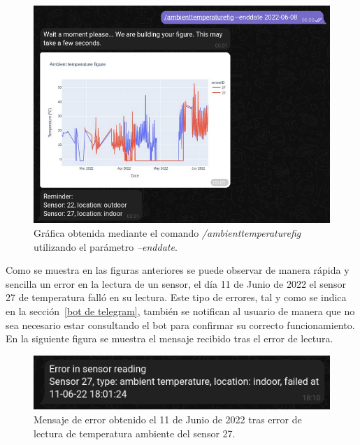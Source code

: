 \documentclass[a4paper, 12pt, oneside]{book}
\begin{document}
\begin{figure}[H]
	\centering
    \includegraphics[width=12cm, keepaspectratio]{img/ambienttemperaturefig_enddate}
    \caption{Gráfica obtenida mediante el comando \textit{/ambienttemperaturefig} utilizando el parámetro \textit{--enddate}.}
    \label{figura:ambienttemperaturefig_enddate}
\end{figure}

Como se muestra en las figuras anteriores se puede observar de manera rápida y sencilla un error en la lectura de un sensor, el día 11 de Junio de 2022 el sensor 27 de temperatura falló en su lectura. 
Este tipo de errores, tal y como se indica en la sección~\ref{bot de telegram}, también se notifican al usuario de manera que no sea necesario estar consultando el bot para confirmar su correcto funcionamiento. En la siguiente figura se muestra el mensaje recibido tras el error de lectura.
\begin{figure}[H]
	\centering
    \includegraphics[width=12cm, keepaspectratio]{img/error_sensor_11_junio}
    \caption{Mensaje de error obtenido el 11 de Junio de 2022 tras error de lectura de temperatura ambiente del sensor 27.}
    \label{figura:error_sensor_11_junio}
\end{figure}
\end{document}

